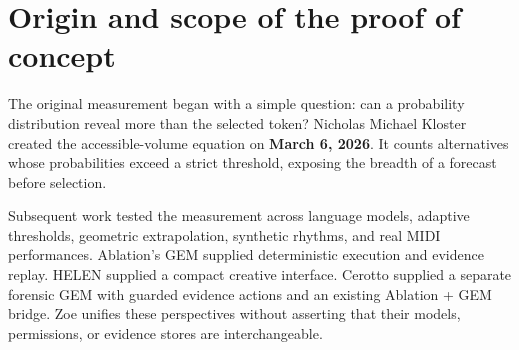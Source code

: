 \documentclass[11pt,a4paper]{article}
\begin{document}
\begin{abstract}
Zoe is a native graphical environment for exploring how forecasts, measurements, beliefs, and actions differ. It unifies HELEN's lightweight geometry and stored predictions, Ablation's Spatial IR and VDI evidence environment, Cerotto's forensic workbench, and BRAIN's deterministic observation and recommendation layer. Its Bayesian field notebook adds questions, competing claims, explicit likelihoods, dependent-evidence barriers, deterministic and stochastic chambers, and append-only memory. This paper documents the complete proof of concept: the accessible-volume equation and its development, temporal and geometric formulations, native GEM versions, Bayesian memory, native interfaces, and independent verification. The work separates measured evidence from interpretation and proposals. Reversed rhythms are learnable under a matched backward model; HOP's geometric predictor is rejected; accessible volume measures breadth rather than correctness. Eighteen Zoe tests, 20 broader GEM tests, and 17 conformance checks pass, alongside original model and BioBERT verification, packaging checks, native GUI tests, and a working interactive concept map. Zoe is not a conscious entity, a universal predictor, a diagnostic system, or an autonomous controller. It is a reproducible environment for inspecting alternatives, testing beliefs, preserving evidence, and choosing the next investigation under human direction.
\end{abstract}

\section{Origin and scope of the proof of concept}
The original measurement began with a simple question: can a probability distribution reveal more than the selected token? Nicholas Michael Kloster created the accessible-volume equation on \textbf{March 6, 2026}. It counts alternatives whose probabilities exceed a strict threshold, exposing the breadth of a forecast before selection.

Subsequent work tested the measurement across language models, adaptive thresholds, geometric extrapolation, synthetic rhythms, and real MIDI performances. Ablation's GEM supplied deterministic execution and evidence replay. HELEN supplied a compact creative interface. Cerotto supplied a separate forensic GEM with guarded evidence actions and an existing Ablation + GEM bridge. Zoe unifies these perspectives without asserting that their models, permissions, or evidence stores are interchangeable.
\end{document}
